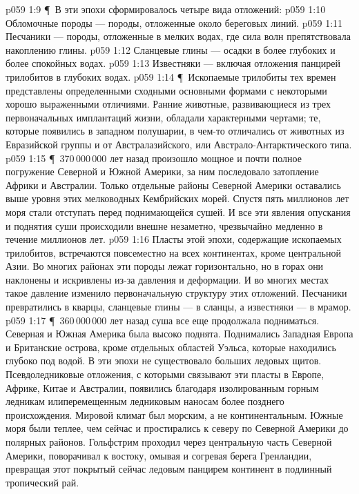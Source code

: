 \vs p059 1:9 \P\ В эти эпохи сформировалось четыре вида отложений:
\vs p059 1:10 \bibnobreakspace Обломочные породы --- породы, отложенные около береговых линий.
\vs p059 1:11 \bibnobreakspace Песчаники --- породы, отложенные в мелких водах, где сила волн препятствовала накоплению глины.
\vs p059 1:12 \bibnobreakspace Сланцевые глины --- осадки в более глубоких и более спокойных водах.
\vs p059 1:13 \bibnobreakspace Известняки --- включая отложения панцирей трилобитов в глубоких водах.
\vs p059 1:14 \P\ Ископаемые трилобиты тех времен представлены определенными сходными основными формами с некоторыми хорошо выраженными отличиями. Ранние животные, развивающиеся из трех первоначальных имплантаций жизни, обладали характерными чертами; те, которые появились в западном полушарии, в чем\hyp{}то отличались от животных из Евразийской группы и от Австралазийского, или Австрало\hyp{}Антарктического типа.
\vs p059 1:15 \P\ 370\,000\,000 лет назад произошло мощное и почти полное погружение Северной и Южной Америки, за ним последовало затопление Африки и Австралии. Только отдельные районы Северной Америки оставались выше уровня этих мелководных Кембрийских морей. Спустя пять миллионов лет моря стали отступать перед поднимающейся сушей. И все эти явления опускания и поднятия суши происходили внешне незаметно, чрезвычайно медленно в течение миллионов лет.
\vs p059 1:16 Пласты этой эпохи, содержащие ископаемых трилобитов, встречаются повсеместно на всех континентах, кроме центральной Азии. Во многих районах эти породы лежат горизонтально, но в горах они наклонены и искривлены из\hyp{}за давления и деформации. И во многих местах такое давление изменило первоначальную структуру этих отложений. Песчаники превратились в кварцы, сланцевые глины --- в сланцы, а известняки --- в мрамор.
\vs p059 1:17 \P\ 360\,000\,000 лет назад суша все еще продолжала подниматься. Северная и Южная Америка была высоко поднята. Поднимались Западная Европа и Британские острова, кроме отдельных областей Уэльса, которые находились глубоко под водой. В эти эпохи не существовало больших ледовых щитов. Псевдоледниковые отложения, с которыми связывают эти пласты в Европе, Африке, Китае и Австралии, появились благодаря изолированным горным ледникам илиперемещенным ледниковым наносам более позднего происхождения. Мировой климат был морским, а не континентальным. Южные моря были теплее, чем сейчас и простирались к северу по Северной Америки до полярных районов. Гольфстрим проходил через центральную часть Северной Америки, поворачивал к востоку, омывая и согревая берега Гренландии, превращая этот покрытый сейчас ледовым панцирем континент в подлинный тропический рай.
